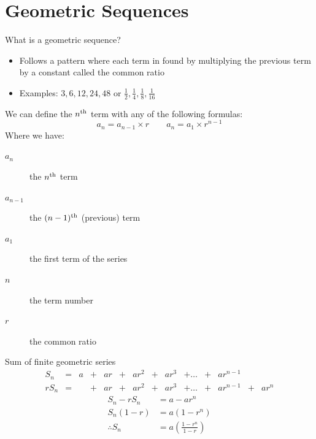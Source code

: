 	\section{Geometric Sequences}
	\begin{namedframe}{What is a geometric sequence?}
		\begin{itemize}
			\item Follows a pattern where each term in found by multiplying the previous term by a constant called the common ratio
			\item Examples: $3,6,12,24,48$ \hspace{2em} or \hspace{2em} $\frac{1}{2},\frac{1}{4},\frac{1}{8},\frac{1}{16}$
		\end{itemize}
		\pause
		We can define the $n\textsuperscript{th}$ term with any of the following formulas:
		\[a_n = a_{n-1} \times r \qquad a_n = a_1 \times r^{n-1}\]
		Where we have:
		\begin{description}
			\item[$a_n$] the $n\textsuperscript{th}$ term
			\item[$a_{n-1}$] the $(n-1)\textsuperscript{th}$ (previous) term
			\item[$a_1$] the first term of the series
			\item[$n$] the term number
			\item[$r$] the common ratio
		\end{description}
	\end{namedframe}
	\begin{namedframe}{Sum of finite geometric series}
		\begin{equation*}
			\begin{array}{lrrrrrrrrrrrrr}
				S_n  &= &a &+ &ar &+ &ar^2 &+ &ar^3 &+ \dots &+ &ar^{n-1} &  &    \\
				rS_n &= &  &+ &ar &+ &ar^2 &+ &ar^3 &+ \dots &+ &ar^{n-1} &+ &ar^n
			\end{array}
		\end{equation*}
		\begin{align*}
			S_n - rS_n &= a - ar^n\\
			S_n(1 - r) &= a(1-r^n)\\
			\therefore S_n &= a\left(\frac{1-r^n}{1-r}\right)
		\end{align*}
	\end{namedframe}
